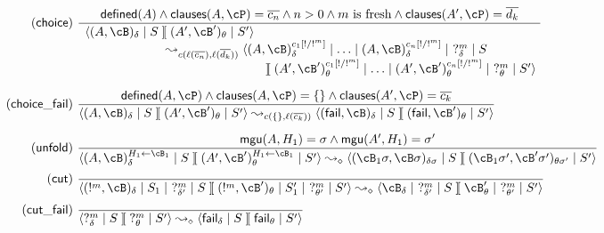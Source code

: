 \documentclass[fleqn]{tlp}
\newcommand{\mgu}{\mathsf{mgu}}
\newcommand{\fail}{\mathsf{fail}}
\newcommand{\clauses}{\mathsf{clauses}}
\newcommand{\sep}{\mathit{\;]\![\;}}
\def \tuple#1{\langle #1 \rangle}
\begin{document}
\begin{appendix}
\begin{figure}[b]
\[\begin{array}{r@{~}l}
     \mathsf{(choice)} &  {\displaystyle 
      \frac{\mathsf{defined}(A) \wedge
        \clauses(A,\cP) = \ol{c_n}\wedge n>0 \wedge m~\mbox{is fresh}
      \wedge \clauses(A',\cP)=\ol{d_k}} 
        {\begin{array}{l@{~}l}
            \tuple{(A,\cB)_\delta\mid S \sep (A',\cB')_\theta\mid S'} \\ 
            \hspace{15ex}\leadsto_{c(\ell(\ol{c_n}),\ell(\ol{d_k}))} 
          \tuple{(A,\cB)_\delta^{c_1[!/!^m]} \mid \ldots\mid
          (A,\cB)_\delta^{c_n[!/!^m]}\mid ~?^m_\delta\mid  S\\
        \hspace{33ex}\sep (A',\cB')_\theta^{c_1[!/!^m]} \mid \ldots\mid
          (A',\cB')_\theta^{c_n[!/!^m]}\mid ~?^m_\theta\mid  S'
        }\end{array}}
        }\\[11ex]

    \mathsf{(choice\_fail)} & {\displaystyle 
      \frac{\mathsf{defined}(A,\cP)\wedge \clauses(A,\cP)=\emptyset
      \wedge \clauses(A',\cP)=\ol{c_k}} 
        {\tuple{(A,\cB)_\delta\mid S \sep (A',\cB')_\theta\mid S'} 
          \leadsto_{c(\emptyset,\ell(\ol{c_k}))} 
          \tuple{(\fail,\cB)_\delta\mid S\sep (\fail,\cB')_\theta\mid S'}}
        }\\[4ex]

    \mathsf{(unfold)} & {\displaystyle 
      \frac{\mgu(A,H_1)=\sigma\wedge\mgu(A',H_1)=\sigma'} 
        {\tuple{(A,\cB)_\delta^{H_1\leftarrow\cB_1}\mid S\sep
          (A',\cB')_\theta^{H_1\leftarrow\cB_1}\mid S'}
          \leadsto_\diamond \tuple{(\cB_1\sigma,\cB\sigma)_{\delta\sigma}\mid S
          \sep (\cB_1\sigma',\cB'\sigma')_{\theta\sigma'}\mid S'}}
        } \\[3ex]

    \mathsf{(cut)} & {\displaystyle 
      \frac{~} 
        {\tuple{(!^m,\cB)_\delta\mid S_1\mid ~?^m_{\delta'}\mid S
          \sep (!^m,\cB')_\theta\mid S'_1\mid ~?^m_{\theta'}\mid S'}
          \leadsto_\diamond \tuple{\cB_{\delta}\mid~?^m_{\delta'}\mid S
          \sep \cB'_{\theta}\mid~?^m_{\theta'}\mid S'}}
        } \\[3ex]

    \mathsf{(cut\_fail)} & {\displaystyle 
      \frac{~} 
        {\tuple{?^m_\delta \mid S\sep ?^m_\theta \mid S'}
          \leadsto_\diamond \tuple{\mathsf{fail}_\delta \mid S\sep \mathsf{fail}_\theta \mid S'}}
        } \\[3ex]


\end{array}\]
\end{figure}
\end{appendix}
\end{document}

